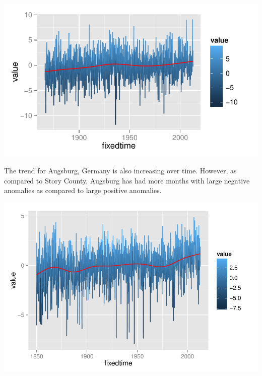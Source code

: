 \documentclass{article}\usepackage{graphicx, color}
\newenvironment{knitrout}{}{} %
\begin{document}

\begin{knitrout}
\color{fgcolor}\includegraphics[width=\linewidth]{figure/story-trend} 
\end{knitrout}


The trend for Augsburg, Germany is also increasing over time. However, as compared to Story County, Augsburg has had more months with large negative anomalies as compared to large positive anomalies.

\begin{knitrout}
\color{fgcolor}\includegraphics[width=\linewidth]{figure/augsburg-trend} 
\end{knitrout}
\end{document}
